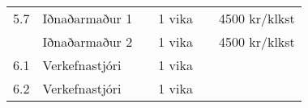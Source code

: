 \documentclass[11pt]{article}
\begin{document}
\begin{center}
\begin{tabular}{rlllrl}
        5.7  &  Iðnaðarmaður 1        &           &  1 vika    &                 &  4500 kr/klkst                     \\
             &  Iðnaðarmaður 2        &           &  1 vika    &                 &  4500 kr/klkst                     \\
\hline
        6.1  &  Verkefnastjóri        &           &  1 vika    &                 &                                    \\
\hline
        6.2  &  Verkefnastjóri        &           &  1 vika    &                 &                                    \\
\hline
\end{tabular}
\end{center}
\end{document}
